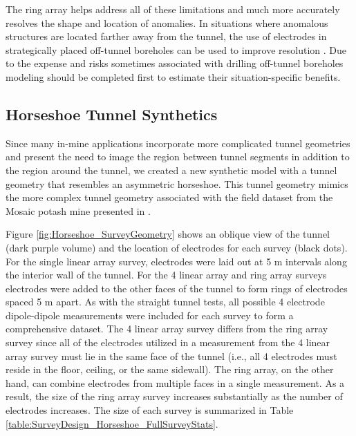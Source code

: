 \documentclass[preprint,authoryear,12pt]{elsarticle}
\begin{document}
The ring array helps address all of these limitations and much more accurately resolves the shape and location of anomalies. In situations where anomalous structures are located farther away from the tunnel, the use of electrodes in strategically placed off-tunnel boreholes can be used to improve resolution \citep{Mitchell2020}. Due to the expense and risks sometimes associated with drilling off-tunnel boreholes modeling should be completed first to estimate their situation-specific benefits.


\subsection{Horseshoe Tunnel Synthetics}
\label{sec:RingArray_Development_Horseshoe_Synth_Intro}

Since many in-mine applications incorporate more complicated tunnel geometries and present the need to image the region between tunnel segments in addition to the region around the tunnel, we created a new synthetic model with a tunnel geometry that resembles an asymmetric horseshoe. This tunnel geometry mimics the more complex tunnel geometry associated with the field dataset from the Mosaic potash mine presented in \citet{Mitchell2016a,Mitchell2016}.

Figure \ref{fig:Horseshoe_SurveyGeometry} shows an oblique view of the tunnel (dark purple volume) and the location of electrodes for each survey (black dots). For the single linear array survey, electrodes were laid out at 5 m intervals along the interior wall of the tunnel. For the 4 linear array and ring array surveys electrodes were added to the other faces of the tunnel to form rings of electrodes spaced 5 m apart. As with the straight tunnel tests, all possible 4 electrode dipole-dipole measurements were included for each survey to form a comprehensive dataset. The 4 linear array survey differs from the ring array survey since all of the electrodes utilized in a measurement from the 4 linear array survey must lie in the same face of the tunnel (i.e., all 4 electrodes must reside in the floor, ceiling, or the same sidewall). The ring array, on the other hand, can combine electrodes from multiple faces in a single measurement. As a result, the size of the ring array survey increases substantially as the number of electrodes increases. The size of each survey is summarized in Table \ref{table:SurveyDesign_Horseshoe_FullSurveyStats}.
\end{document}
